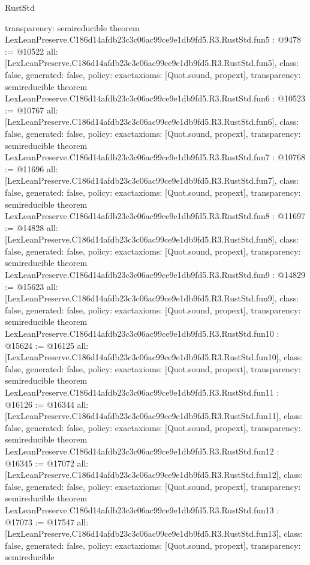\begin{lexlean}{RustStd}
\begin{coremodule}
{  transparency: semireducible
}
theorem LexLeanPreserve.C186d14afdb23c3c06ac99ce9e1db9fd5.R3.RustStd.fun5 : @9478 := @10522 {
  all: [LexLeanPreserve.C186d14afdb23c3c06ac99ce9e1db9fd5.R3.RustStd.fun5],
  class: false,
  generated: false,
  policy: exact{axioms: [Quot.sound, propext]},
  transparency: semireducible
}
theorem LexLeanPreserve.C186d14afdb23c3c06ac99ce9e1db9fd5.R3.RustStd.fun6 : @10523 := @10767 {
  all: [LexLeanPreserve.C186d14afdb23c3c06ac99ce9e1db9fd5.R3.RustStd.fun6],
  class: false,
  generated: false,
  policy: exact{axioms: [Quot.sound, propext]},
  transparency: semireducible
}
theorem LexLeanPreserve.C186d14afdb23c3c06ac99ce9e1db9fd5.R3.RustStd.fun7 : @10768 := @11696 {
  all: [LexLeanPreserve.C186d14afdb23c3c06ac99ce9e1db9fd5.R3.RustStd.fun7],
  class: false,
  generated: false,
  policy: exact{axioms: [Quot.sound, propext]},
  transparency: semireducible
}
theorem LexLeanPreserve.C186d14afdb23c3c06ac99ce9e1db9fd5.R3.RustStd.fun8 : @11697 := @14828 {
  all: [LexLeanPreserve.C186d14afdb23c3c06ac99ce9e1db9fd5.R3.RustStd.fun8],
  class: false,
  generated: false,
  policy: exact{axioms: [Quot.sound, propext]},
  transparency: semireducible
}
theorem LexLeanPreserve.C186d14afdb23c3c06ac99ce9e1db9fd5.R3.RustStd.fun9 : @14829 := @15623 {
  all: [LexLeanPreserve.C186d14afdb23c3c06ac99ce9e1db9fd5.R3.RustStd.fun9],
  class: false,
  generated: false,
  policy: exact{axioms: [Quot.sound, propext]},
  transparency: semireducible
}
theorem LexLeanPreserve.C186d14afdb23c3c06ac99ce9e1db9fd5.R3.RustStd.fun10 : @15624 := @16125 {
  all: [LexLeanPreserve.C186d14afdb23c3c06ac99ce9e1db9fd5.R3.RustStd.fun10],
  class: false,
  generated: false,
  policy: exact{axioms: [Quot.sound, propext]},
  transparency: semireducible
}
theorem LexLeanPreserve.C186d14afdb23c3c06ac99ce9e1db9fd5.R3.RustStd.fun11 : @16126 := @16344 {
  all: [LexLeanPreserve.C186d14afdb23c3c06ac99ce9e1db9fd5.R3.RustStd.fun11],
  class: false,
  generated: false,
  policy: exact{axioms: [Quot.sound, propext]},
  transparency: semireducible
}
theorem LexLeanPreserve.C186d14afdb23c3c06ac99ce9e1db9fd5.R3.RustStd.fun12 : @16345 := @17072 {
  all: [LexLeanPreserve.C186d14afdb23c3c06ac99ce9e1db9fd5.R3.RustStd.fun12],
  class: false,
  generated: false,
  policy: exact{axioms: [Quot.sound, propext]},
  transparency: semireducible
}
theorem LexLeanPreserve.C186d14afdb23c3c06ac99ce9e1db9fd5.R3.RustStd.fun13 : @17073 := @17547 {
  all: [LexLeanPreserve.C186d14afdb23c3c06ac99ce9e1db9fd5.R3.RustStd.fun13],
  class: false,
  generated: false,
  policy: exact{axioms: [Quot.sound, propext]},
  transparency: semireducible
}
\end{coremodule}
\end{lexlean}
